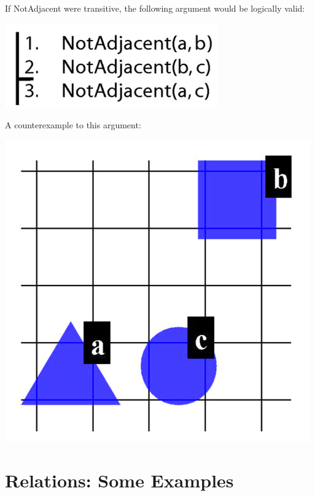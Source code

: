 \documentclass[12pt]{extarticle}
\begin{document}
\begin{multicols*}{3}
\begin{minipage}{\columnwidth}
 
If NotAdjacent were transitive, the following argument would be logically valid:
 
\begin{center}
\includegraphics[scale=0.3]{img/unit_125_argument.png}
\end{center}
\end{minipage}
 
\begin{minipage}{\columnwidth}
 
A counterexample to this argument:
 
\begin{center}
\includegraphics[scale=0.3]{img/unit_125_counterexample.png}
\end{center}
\end{minipage}
 
 
 
\section{Relations: Some Examples}
 

\end{multicols*}
\end{document}
